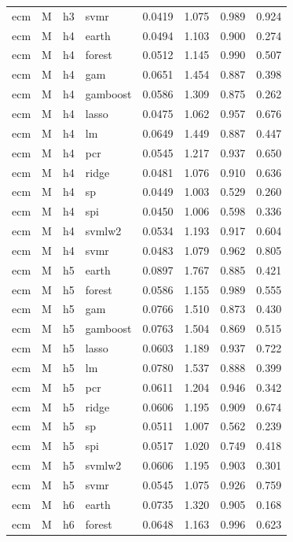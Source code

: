 \begin{ThreePartTable}
\begin{longtable}[t]{llclcccc}
ecm & M & h3 & svmr & 0.0419 & 1.075 & 0.989 & 0.924\\
\addlinespace
ecm & M & h4 & earth & 0.0494 & 1.103 & 0.900 & 0.274\\
ecm & M & h4 & forest & 0.0512 & 1.145 & 0.990 & 0.507\\
ecm & M & h4 & gam & 0.0651 & 1.454 & 0.887 & 0.398\\
ecm & M & h4 & gamboost & 0.0586 & 1.309 & 0.875 & 0.262\\
ecm & M & h4 & lasso & 0.0475 & 1.062 & 0.957 & 0.676\\
ecm & M & h4 & lm & 0.0649 & 1.449 & 0.887 & 0.447\\
ecm & M & h4 & pcr & 0.0545 & 1.217 & 0.937 & 0.650\\
ecm & M & h4 & ridge & 0.0481 & 1.076 & 0.910 & 0.636\\
ecm & M & h4 & sp & 0.0449 & 1.003 & 0.529 & 0.260\\
ecm & M & h4 & spi & 0.0450 & 1.006 & 0.598 & 0.336\\
ecm & M & h4 & svmlw2 & 0.0534 & 1.193 & 0.917 & 0.604\\
ecm & M & h4 & svmr & 0.0483 & 1.079 & 0.962 & 0.805\\
\addlinespace
ecm & M & h5 & earth & 0.0897 & 1.767 & 0.885 & 0.421\\
ecm & M & h5 & forest & 0.0586 & 1.155 & 0.989 & 0.555\\
ecm & M & h5 & gam & 0.0766 & 1.510 & 0.873 & 0.430\\
ecm & M & h5 & gamboost & 0.0763 & 1.504 & 0.869 & 0.515\\
ecm & M & h5 & lasso & 0.0603 & 1.189 & 0.937 & 0.722\\
ecm & M & h5 & lm & 0.0780 & 1.537 & 0.888 & 0.399\\
ecm & M & h5 & pcr & 0.0611 & 1.204 & 0.946 & 0.342\\
ecm & M & h5 & ridge & 0.0606 & 1.195 & 0.909 & 0.674\\
ecm & M & h5 & sp & 0.0511 & 1.007 & 0.562 & 0.239\\
ecm & M & h5 & spi & 0.0517 & 1.020 & 0.749 & 0.418\\
ecm & M & h5 & svmlw2 & 0.0606 & 1.195 & 0.903 & 0.301\\
ecm & M & h5 & svmr & 0.0545 & 1.075 & 0.926 & 0.759\\
\addlinespace
ecm & M & h6 & earth & 0.0735 & 1.320 & 0.905 & 0.168\\
ecm & M & h6 & forest & 0.0648 & 1.163 & 0.996 & 0.623\\

\end{longtable}
\end{ThreePartTable}
